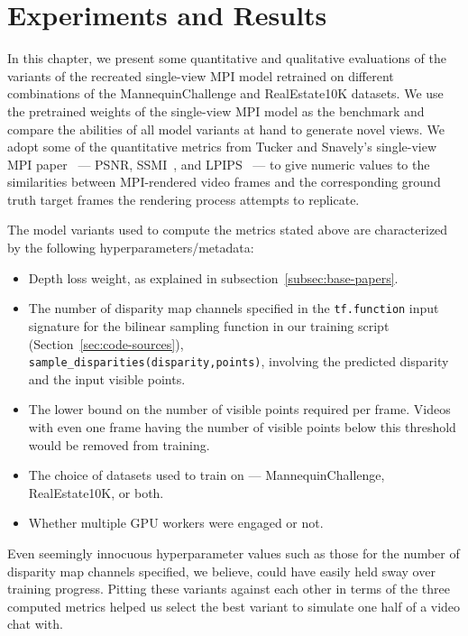 \chapter{Experiments and Results}\label{ch4:experiments-results}

In this chapter, we present some quantitative and qualitative evaluations of the variants of the recreated single-view MPI model retrained on different combinations of the MannequinChallenge and RealEstate10K datasets. We use the pretrained weights of the single-view MPI model as the benchmark and compare the abilities of all model variants at hand to generate novel views. We adopt some of the quantitative metrics from Tucker and Snavely's single-view MPI paper~\cite{single_view_mpi} --- PSNR, SSMI~\cite{wang_image_2004}, and LPIPS~\cite{zhang_unreasonable_2018} --- to give numeric values to the similarities between MPI-rendered video frames and the corresponding ground truth target frames the rendering process attempts to replicate.

The model variants used to compute the metrics stated above are characterized by the following hyperparameters/metadata:
\begin{itemize}
    \item Depth loss weight, as explained in subsection~\ref{subsec:base-papers}.
    \item The number of disparity map channels specified in the \texttt{tf.function} input signature for the bilinear sampling function in our training script (Section~\ref{sec:code-sources}),\\\texttt{sample\_disparities(disparity,points)}, involving the predicted disparity and the input visible points.
    \item The lower bound on the number of visible points required per frame. Videos with even one frame having the number of visible points below this threshold would be removed from training.
    \item The choice of datasets used to train on --- MannequinChallenge, RealEstate10K, or both.
    \item Whether multiple GPU workers were engaged or not.
\end{itemize}
Even seemingly innocuous hyperparameter values such as those for the number of disparity map channels specified, we believe, could have easily held sway over training progress. Pitting these variants against each other in terms of the three computed metrics helped us select the best variant to simulate one half of a video chat with.

